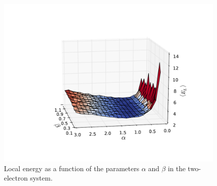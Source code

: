 \documentclass[english, a4paper]{article}
\begin{document}
\begin{figure}[H]
\centering
\includegraphics[width=0.8\linewidth, trim={0 2cm 0 4.5cm}, clip]{figures/energySurface/energyPlot15x15N2}
\caption{Local energy as a function of the parameters $\alpha$ and $\beta$ in the two-electron system.}
\label{fig:energyPlot15x15N2}
\end{figure}
\end{document}

